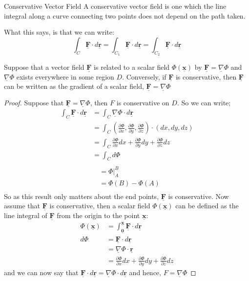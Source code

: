 \documentclass{article}
\renewcommand{\vec}[1]{\underline{\textbf{#1}}}
\newcommand{\p}{\Phi}
\newcommand{\nab}{\underline{\nabla}}
\newcommand{\pd}[2]{\frac{\partial #1}{\partial #2}}
\begin{document}
\noindent\begin{definition}{Conservative Vector Field}{}
 A conservative vector field is one which the line integral along a curve connecting two points does not depend on the path taken.
\end{definition}\vspace{10pt}

What this says, is that we can write:
$$ \int_{C} {\vec F \cdot d\vec r} = \int_{C_1}{\vec F \cdot d\vec r} = \int_{C_2}{\vec F \cdot d\vec r} $$

\noindent\begin{theorem}{}{}
 Suppose that a vector field $\vec F$ is related to a scalar field $\p (\vec x)$ by $\displaystyle{\vec F = \nab \p}$ and $\nab\p$ exists everywhere in some region $D$. Conversely, if $\vec F$ is conservative, then $\vec F$ can be written as the gradient of a scalar field, $\displaystyle{\vec F = \nab\p}$
\end{theorem}\vspace{10pt}
\begin{proof}
  Suppose that $\displaystyle{\vec F = \nab\p}$, then $F$ is conservative on $D$. So we can write;
  \begin{align*}
     \int_C {\vec F \cdot d\vec r} &= \int_C {\nab\p \cdot d\vec r}\\
     &= \int_C \left( \pd{\p}{x}, \pd{\p}{y}, \pd{\p}{z} \right)\cdot\left(dx,dy, dz\right)\\
     &= \int_C \pd{\p}{x}dx + \pd{\p}{y}dy + \pd{\p}{z}dz\\
     &= \int_C d\p\\
   \end{align*}
   \begin{align*}
     &= \p\Bigr|_A^B \\
     &= \p(B) - \p(A)\\
  \end{align*}
  So as this result only matters about the end points, $\vec F$ is conservative. Now assume that $\vec F$ is conservative, then a scalar field $\p(\vec x)$ can be defined as the line integral of $\vec F$ from the origin to the point $\vec x$:
  \begin{align*}
    \p(\vec x) &= \int_{\vec 0}^{\vec x}{\vec F \cdot d\vec r}\\
    d\p &= \vec F \cdot d\vec r \\
    &= \nab\p \cdot \vec r \\
    &= \pd{\p}{x}dx +\pd{\p}{y}dy + \pd{\p}{z}dz
  \end{align*}
  and we can now say that $\displaystyle{\vec F \cdot d\vec r = \nab\p \cdot d\vec r}$ and hence, $F = \nab\p$
\end{proof}
\end{document}
